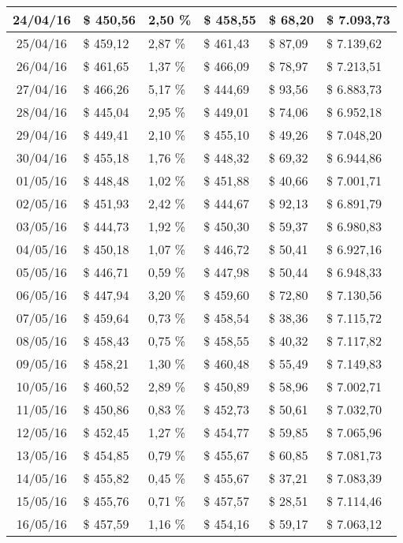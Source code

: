\begin{small}
\begin{longtable}{|c|l|l|l|l|l|}
24/04/16 & \$ 450,56 & 2,50 \% & \$ 458,55 & \$ 68,20 & \$ 7.093,73 \\ \hline
25/04/16 & \$ 459,12 & 2,87 \% & \$ 461,43 & \$ 87,09 & \$ 7.139,62 \\ \hline
26/04/16 & \$ 461,65 & 1,37 \% & \$ 466,09 & \$ 78,97 & \$ 7.213,51 \\ \hline
27/04/16 & \$ 466,26 & 5,17 \% & \$ 444,69 & \$ 93,56 & \$ 6.883,73 \\ \hline
28/04/16 & \$ 445,04 & 2,95 \% & \$ 449,01 & \$ 74,06 & \$ 6.952,18 \\ \hline
29/04/16 & \$ 449,41 & 2,10 \% & \$ 455,10 & \$ 49,26 & \$ 7.048,20 \\ \hline
30/04/16 & \$ 455,18 & 1,76 \% & \$ 448,32 & \$ 69,32 & \$ 6.944,86 \\ \hline
01/05/16 & \$ 448,48 & 1,02 \% & \$ 451,88 & \$ 40,66 & \$ 7.001,71 \\ \hline
02/05/16 & \$ 451,93 & 2,42 \% & \$ 444,67 & \$ 92,13 & \$ 6.891,79 \\ \hline
03/05/16 & \$ 444,73 & 1,92 \% & \$ 450,30 & \$ 59,37 & \$ 6.980,83 \\ \hline
04/05/16 & \$ 450,18 & 1,07 \% & \$ 446,72 & \$ 50,41 & \$ 6.927,16 \\ \hline
05/05/16 & \$ 446,71 & 0,59 \% & \$ 447,98 & \$ 50,44 & \$ 6.948,33 \\ \hline
06/05/16 & \$ 447,94 & 3,20 \% & \$ 459,60 & \$ 72,80 & \$ 7.130,56 \\ \hline
07/05/16 & \$ 459,64 & 0,73 \% & \$ 458,54 & \$ 38,36 & \$ 7.115,72 \\ \hline
08/05/16 & \$ 458,43 & 0,75 \% & \$ 458,55 & \$ 40,32 & \$ 7.117,82 \\ \hline
09/05/16 & \$ 458,21 & 1,30 \% & \$ 460,48 & \$ 55,49 & \$ 7.149,83 \\ \hline
10/05/16 & \$ 460,52 & 2,89 \% & \$ 450,89 & \$ 58,96 & \$ 7.002,71 \\ \hline
11/05/16 & \$ 450,86 & 0,83 \% & \$ 452,73 & \$ 50,61 & \$ 7.032,70 \\ \hline
12/05/16 & \$ 452,45 & 1,27 \% & \$ 454,77 & \$ 59,85 & \$ 7.065,96 \\ \hline
13/05/16 & \$ 454,85 & 0,79 \% & \$ 455,67 & \$ 60,85 & \$ 7.081,73 \\ \hline
14/05/16 & \$ 455,82 & 0,45 \% & \$ 455,67 & \$ 37,21 & \$ 7.083,39 \\ \hline
15/05/16 & \$ 455,76 & 0,71 \% & \$ 457,57 & \$ 28,51 & \$ 7.114,46 \\ \hline
16/05/16 & \$ 457,59 & 1,16 \% & \$ 454,16 & \$ 59,17 & \$ 7.063,12 \\ \hline

\end{longtable}
\end{small}
